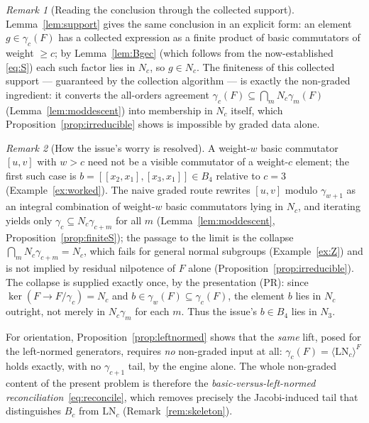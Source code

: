 \documentclass{amsart}
\theoremstyle{definition}
\theoremstyle{remark}
\newtheorem{remark}{Remark}
\begin{document}
\begin{remark}[Reading the conclusion through the collected support]\label{rem:support-read}
Lemma~\ref{lem:support} gives the same conclusion in an explicit form: an element
$g\in\gamma_c(F)$ has a collected expression as a finite product of basic commutators of weight
$\ge c$; by Lemma~\ref{lem:Bgec} (which follows from the now-established \eqref{eq:S}) each such
factor lies in $N_c$, so $g\in N_c$. The finiteness of this collected support --- guaranteed by
the collection algorithm --- is exactly the non-graded ingredient: it converts the
all-orders agreement $\gamma_c(F)\subseteq\bigcap_m N_c\gamma_m(F)$ (Lemma~\ref{lem:moddescent})
into membership in $N_c$ itself, which Proposition~\ref{prop:irreducible} shows is impossible by
graded data alone.
\end{remark}

\begin{remark}[How the issue's worry is resolved]\label{rem:issue}
A weight-$w$ basic commutator $[u,v]$ with $w>c$ need not be a visible commutator of a
weight-$c$ element; the first such case is $b=[[x_2,x_1],[x_3,x_1]]\in B_4$ relative to
$c=3$ (Example~\ref{ex:worked}). The naive graded route rewrites $[u,v]$ modulo
$\gamma_{w+1}$ as an integral combination of weight-$w$ basic commutators lying in $N_c$, and
iterating yields only $\gamma_c\subseteq N_c\gamma_{c+m}$ for all $m$
(Lemma~\ref{lem:moddescent}, Proposition~\ref{prop:finiteS}); the passage to the limit is the
collapse $\bigcap_m N_c\gamma_{c+m}=N_c$, which fails for general normal subgroups
(Example~\ref{ex:Z}) and is not implied by residual nilpotence of $F$ alone
(Proposition~\ref{prop:irreducible}). The collapse is supplied exactly once, by the
presentation (PR): since $\ker(F\to F/\gamma_c)=N_c$ and $b\in\gamma_w(F)\subseteq\gamma_c(F)$,
the element $b$ lies in $N_c$ outright, not merely in $N_c\gamma_m$ for each $m$. Thus the
issue's $b\in B_4$ lies in $N_3$.

For orientation, Proposition~\ref{prop:leftnormed} shows that the \emph{same} lift, posed for
the left-normed generators, requires \emph{no} non-graded input at all:
$\gamma_c(F)=\langle\mathrm{LN}_c\rangle^{F}$ holds exactly, with no $\gamma_{c+1}$ tail, by the
engine alone. The whole non-graded content of the present problem is therefore the
\emph{basic-versus-left-normed reconciliation}~\eqref{eq:reconcile}, which removes precisely the
Jacobi-induced tail that distinguishes $B_c$ from $\mathrm{LN}_c$
(Remark~\ref{rem:skeleton}).
\end{remark}
\end{document}

